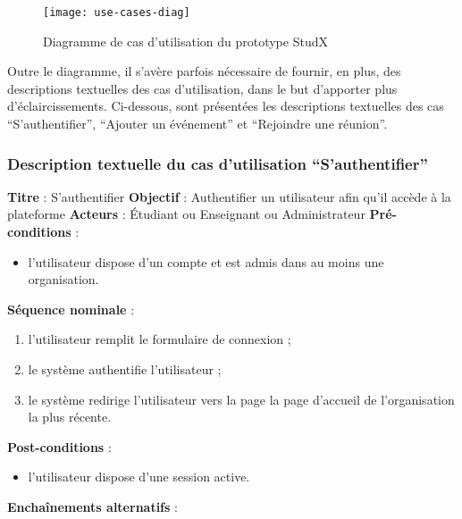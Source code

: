 \begin{figure}[h]
  \centering
  \texttt{[image: use-cases-diag]}
  \caption{Diagramme de cas d'utilisation du prototype StudX}
  \label{fig:use_case_diag}
\end{figure}


Outre le diagramme, il s'avère parfois nécessaire de fournir, en plus, des descriptions textuelles des cas 
d’utilisation, dans le but d’apporter plus d'éclaircissements. 
Ci-dessous, sont présentées les descriptions textuelles des cas “S’authentifier”, “Ajouter un événement” et “Rejoindre une réunion”.

\subsubsection{Description textuelle du cas d’utilisation “S’authentifier”}
\textbf{Titre} : S’authentifier\newline
\textbf{Objectif} : Authentifier un utilisateur afin qu’il accède à la plateforme\newline
\textbf{Acteurs} : Étudiant ou Enseignant ou Administrateur\newline
\textbf{Pré-conditions} : 
\begin{itemize}[noitemsep,topsep=0pt]
  \item l’utilisateur dispose d’un compte et est admis dans au moins une organisation.
\end{itemize}
\textbf{Séquence nominale} :
\begin{enumerate}[noitemsep,topsep=0pt]
  \item l’utilisateur remplit le formulaire de connexion ;
  \item le système authentifie l’utilisateur ;
  \item le système redirige l’utilisateur vers la page la page d'accueil de l’organisation la plus récente.
\end{enumerate}
\textbf{Post-conditions} : 
\begin{itemize}[noitemsep,topsep=0pt]
  \item l’utilisateur dispose d’une session active.
\end{itemize}
\textbf{Enchaînements alternatifs} :
